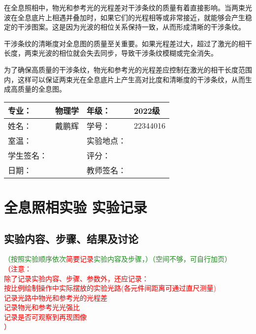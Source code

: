 \documentclass[dvipsnames, svgnames,a4paper,11pt]{article}
\begin{document}
	在全息照相中，物光和参考光的光程差对干涉条纹的质量有着直接影响。当两束光波在全息底片上相遇并叠加时，如果它们的光程相等或非常接近，就能够会产生稳定的干涉图案。这是因为光波的相位关系保持一致，从而形成清晰的干涉条纹。

	干涉条纹的清晰度对全息图的质量至关重要。如果光程差过大，超过了激光的相干长度，两束光波的相位就会失去同步，导致干涉条纹模糊或完全消失。

	为了确保高质量的干涉条纹，物光和参考光的光程差应控制在激光的相干长度范围内，这样可以保证两束光在全息底片上产生高对比度和清晰度的干涉条纹，从而生成高质量的全息图。

\clearpage
\begin{table}
	\renewcommand\arraystretch{1.7}
	\centering
	\begin{tabularx}{\textwidth}{|X|X|X|X|}
	\hline
	专业：& 物理学 &年级：& 2022级 \\
	\hline
	姓名：& 戴鹏辉 & 学号：& 22344016 \\
	\hline
	室温：&  & 实验地点： &  \\
	\hline
	学生签名：& & 评分： &\\
	\hline
	日期：&  & 教师签名：&\\
	\hline
	\end{tabularx}
\end{table}

\section{全息照相实验 \quad\heiti 实验记录}
\subsection{实验内容、步骤、结果及讨论}\textcolor{ForestGreen}{（按照实验顺序依次}\textcolor{red}{简要记录}\textcolor{ForestGreen}{实验内容及步骤，）（空间不够，可自行加页）}\\
\textcolor{red}{
（注意： \\
除了记录实验内容、步骤、参数外，还应记录：\\
按比例绘制操作中实际摆放的实验光路(各元件间距离可通过直尺测量)\\
记录光路中物光和参考光的光程差\\
记录物光和参考光光强比\\
记录是否可观察到再现图像\\
）
}


		

\end{document}
